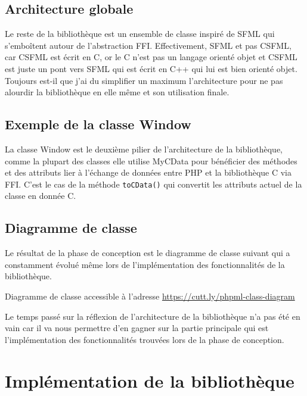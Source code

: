 \documentclass[11pt,a4paper,krantz2,11pt,oneside]{krantz}
\begin{document}
\hypertarget{architecture-globale}{%
\subsection{Architecture globale}\label{architecture-globale}}

Le reste de la bibliothèque est un ensemble de classe inspiré de SFML qui s'emboîtent autour de l'abstraction FFI. Effectivement, SFML et pas CSFML, car CSFML est écrit en C, or le C n'est pas un langage orienté objet et CSFML est juste un pont vers SFML qui est écrit en C++ qui lui est bien orienté objet. Toujours est-il que j'ai du simplifier un maximum l'architecture pour ne pas alourdir la bibliothèque en elle même et son utilisation finale.

\hypertarget{exemple-de-la-classe-window}{%
\subsection{Exemple de la classe Window}\label{exemple-de-la-classe-window}}

La classe Window est le deuxième pilier de l'architecture de la bibliothèque, comme la plupart des classes elle utilise MyCData pour bénéficier des méthodes et des attributs lier à l'échange de données entre PHP et la bibliothèque C via FFI. C'est le cas de la méthode \texttt{toCData()} qui convertit les attributs actuel de la classe en donnée C.

\hypertarget{diagramme-de-classe}{%
\subsection{Diagramme de classe}\label{diagramme-de-classe}}

Le résultat de la phase de conception est le diagramme de classe suivant qui a constamment évolué même lors de l'implémentation des fonctionnalités de la bibliothèque.

\label{fig:class-diagramm}Diagramme de classe accessible à l'adresse \url{https://cutt.ly/phpml-class-diagram}

Le temps passé sur la réflexion de l'architecture de la bibliothèque n'a pas été en vain car il va nous permettre d'en gagner sur la partie principale qui est l'implémentation des fonctionnalités trouvées lors de la phase de conception.

\hypertarget{impluxe9mentation-de-la-bibliothuxe8que}{%
\section{Implémentation de la bibliothèque}\label{impluxe9mentation-de-la-bibliothuxe8que}}
\end{document}
